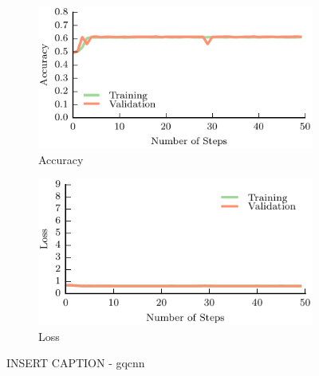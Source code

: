 \begin{figure}[t!]
    \centering
    \begin{subfigure}[t]{0.49\textwidth}
        \includegraphics[width=0.9\columnwidth]{figs/gqcnn_accuracy.pdf}
        \caption{Accuracy} \label{fig:accuracy}
        \end{subfigure}
    \begin{subfigure}[t]{0.49\textwidth}
        \includegraphics[width=0.9\columnwidth]{figs/gqcnn_loss.pdf}
        \caption{Loss} \label{fig:loss}
    \end{subfigure}
\caption{INSERT CAPTION - gqcnn} \label{fig:gqcnn_results}
\end{figure}

